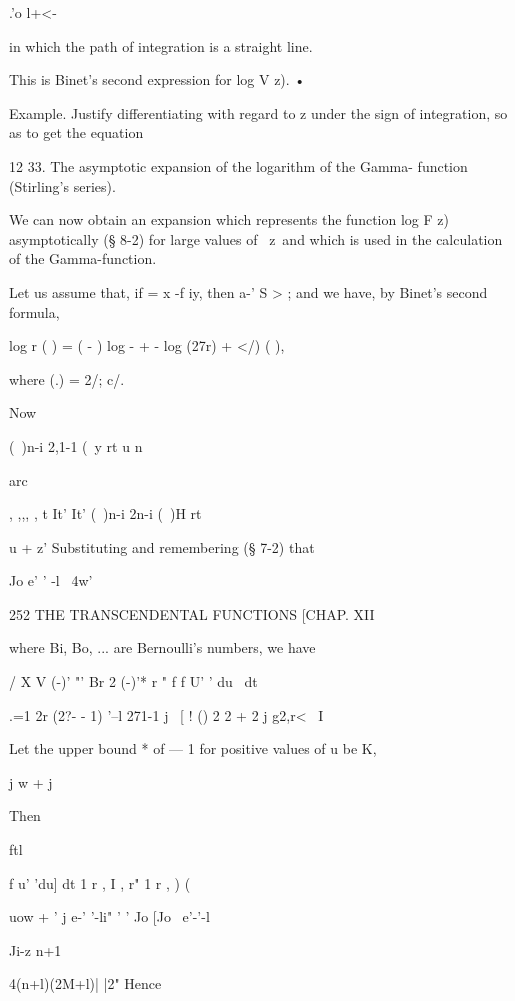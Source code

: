 .'o l+<-

in which the path of integration is a straight line.

This is Binet's second expression for log V z). •

Example. Justify differentiating with regard to z under the sign of
integration, so as to get the equation

12 33. The asymptotic expansion of the logarithm of the Gamma-
function (Stirling's series).

We can now obtain an expansion which represents the function log F z)
asymptotically (§ 8-2) for large values of \ z\, and which is used in
the calculation of the Gamma-function.

Let us assume that, if = x -f iy, then a-' S > ; and we have, by
Binet's second formula,

log r ( ) = ( - ) log - + - log (27r) + </) ( ),

where (.) = 2/; c/.

Now

(\ )n-i 2,1-1 (\ y rt u n



arc



, ,,, , t It' It' (\ )n-i 2n-i (\ )H rt



u + z' Substituting and remembering (§ 7-2) that

Jo e' ' -l ~4w'



252 THE TRANSCENDENTAL FUNCTIONS [CHAP. XII

where Bi, Bo, ... are Bernoulli's numbers, we have

  / X V (-)' "' Br 2 (-)'* r " f f U' ' du \ dt



.=1 2r (2?- - 1) '--l 271-1 j \ [ ! () 2 2 + 2 j g2,r< \ I

Let the upper bound * of — 1 for positive values of u be K,

j w + j

Then



ftl



f u' 'du] dt 1 r , I , r" 1 r , ) (



uow + ' j e-' '-li" ' ' Jo [Jo \ e'-'-l

Ji-z n+1



 4(n+l)(2M+l)| |2" Hence

